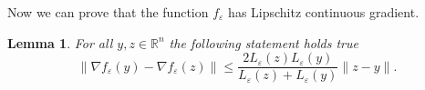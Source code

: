\documentclass[11pt]{article}
\numberwithin{equation}{section}
\newtheorem{lemma}{Lemma}[proposition]
\begin{document}
%
%
%

Now we can prove that the function $f_{\varepsilon}$ has Lipschitz continuous gradient.

\begin{lemma} \label{StateEq65}
For all $y,z \in \mathbb{R}^n$ the following statement holds true
\begin{equation*}
	\| \nabla f_{\varepsilon}(y) - \nabla f_{\varepsilon}(z) \| \leq \frac{2L_{\varepsilon}(z)L_{\varepsilon}(y)}{L_{\varepsilon}(z)+L_{\varepsilon}(y)} \|z - y\|.
\end{equation*}
\end{lemma}
\end{document}
